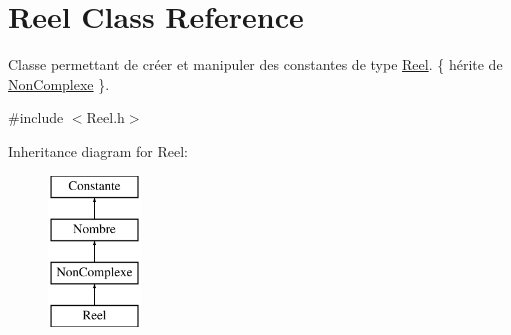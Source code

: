 \hypertarget{classReel}{\section{\-Reel \-Class \-Reference}
\label{classReel}
}


\-Classe permettant de créer et manipuler des constantes de type \hyperlink{classReel}{\-Reel}. \{ hérite de \hyperlink{classNonComplexe}{\-Non\-Complexe} \}.  




{\ttfamily \#include $<$\-Reel.\-h$>$}

\-Inheritance diagram for \-Reel\-:\begin{figure}[H]
\begin{center}
\leavevmode
\includegraphics[height=4.000000cm]{classReel}
\end{center}
\end{figure}
